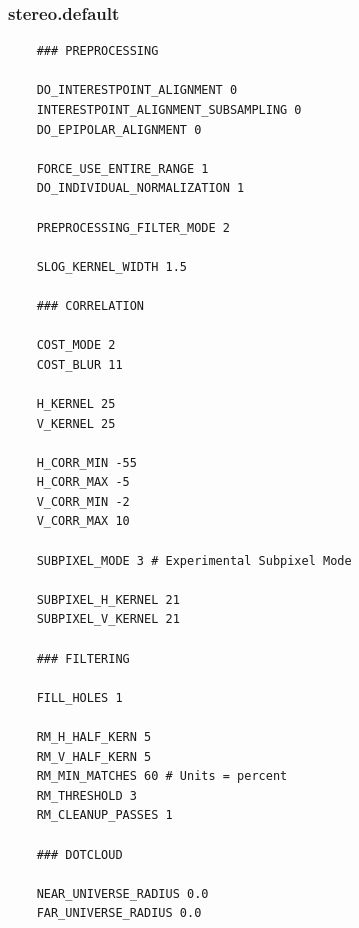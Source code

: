 \subsubsection*{stereo.default}
\begin{verbatim}
    ### PREPROCESSING

    DO_INTERESTPOINT_ALIGNMENT 0
    INTERESTPOINT_ALIGNMENT_SUBSAMPLING 0
    DO_EPIPOLAR_ALIGNMENT 0

    FORCE_USE_ENTIRE_RANGE 1
    DO_INDIVIDUAL_NORMALIZATION 1

    PREPROCESSING_FILTER_MODE 2

    SLOG_KERNEL_WIDTH 1.5

    ### CORRELATION

    COST_MODE 2
    COST_BLUR 11

    H_KERNEL 25
    V_KERNEL 25

    H_CORR_MIN -55
    H_CORR_MAX -5
    V_CORR_MIN -2
    V_CORR_MAX 10

    SUBPIXEL_MODE 3 # Experimental Subpixel Mode

    SUBPIXEL_H_KERNEL 21
    SUBPIXEL_V_KERNEL 21

    ### FILTERING

    FILL_HOLES 1

    RM_H_HALF_KERN 5
    RM_V_HALF_KERN 5
    RM_MIN_MATCHES 60 # Units = percent
    RM_THRESHOLD 3
    RM_CLEANUP_PASSES 1

    ### DOTCLOUD

    NEAR_UNIVERSE_RADIUS 0.0
    FAR_UNIVERSE_RADIUS 0.0
\end{verbatim}
